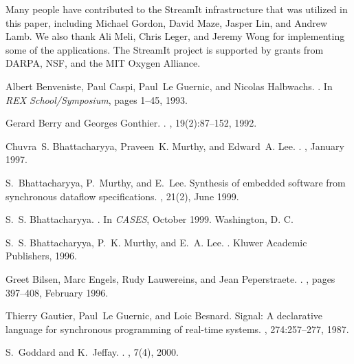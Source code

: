 \documentclass{sig-alt-full}
\begin{document}
Many people have contributed to the StreamIt infrastructure that was
utilized in this paper, including Michael Gordon, David Maze, Jasper
Lin, and Andrew Lamb.  We also thank Ali Meli, Chris Leger, and Jeremy
Wong for implementing some of the applications.  The StreamIt project
is supported by grants from DARPA, NSF, and the MIT Oxygen Alliance.
%
{\small
\begin{thebibliography}{10}

Albert Benveniste, Paul Caspi, Paul~Le Guernic, and Nicolas Halbwachs.
.
\newblock In {\em {REX} School/Symposium}, pages 1--45, 1993.

Gerard Berry and Georges Gonthier.
.
, 19(2):87--152, 1992.

Chuvra~S. Bhattacharyya, Praveen~K. Murthy, and Edward~A. Lee.
.
, January
  1997.

S.~Bhattacharyya, P.~Murthy, and E.~Lee.
\newblock Synthesis of embedded software from synchronous dataflow
  specifications.
, 21(2), June 1999.

S.~S. Bhattacharyya.
.
\newblock In {\em CASES}, October 1999.
\newblock Washington, D. C.

S.~S. Bhattacharyya, P.~K. Murthy, and E.~A. Lee.
.
\newblock Kluwer Academic Publishers, 1996.

Greet Bilsen, Marc Engels, Rudy Lauwereins, and Jean Peperstraete.
.
, pages 397--408, February
  1996.

Thierry Gautier, Paul~Le Guernic, and Loic Besnard.
\newblock Signal: A declarative language for synchronous programming of
  real-time systems.
,
  274:257--277, 1987.

S.~Goddard and K.~Jeffay.
.
, 7(4), 2000.


\end{thebibliography}}
\end{document}
